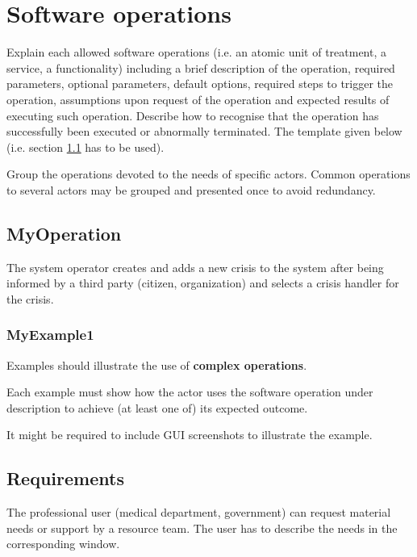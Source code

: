 \chapter{Software operations}
\label{chap:soptware_operations}


Explain each allowed software operations (i.e. an atomic unit of treatment, a service, a functionality) including a brief description of the operation, required parameters, optional parameters, default options, required steps to trigger the operation, assumptions upon request of the operation and expected results of executing such operation.
Describe how to recognise that the operation has successfully been executed or
abnormally terminated. The template given below (i.e. section \ref{operation:MyOperation} has to be used).

Group the operations devoted to the needs of specific actors. Common
operations to several actors may be grouped and presented once to avoid redundancy.


\section{MyOperation}
\label{operation:MyOperation}
The system operator creates and adds a new crisis to the system after being
informed by a third party (citizen, organization) and selects a crisis handler for the crisis.
 
\subsection{MyExample1}
Examples should illustrate the use of \textbf{complex operations}.

Each example must show how the actor uses the software operation under
description to achieve (at least one of) its expected outcome.

It might be required to include GUI screenshots to illustrate the example.\\

\section{Requirements}
\label{operation:Requirements}
The professional user (medical department, government) can
request material needs or support by a resource team. The user has to describe
the needs in the corresponding window.\\


